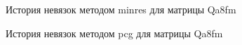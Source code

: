 \begin{figure}[H]
    \renewcommand{\figurename}{Рисунок}
    \caption{История невязок методом minres для матрицы Qa8fm}
    \label{fig:image_18}
\end{figure}

\begin{figure}[H]
    \renewcommand{\figurename}{Рисунок}
    \caption{История невязок методом pcg для матрицы Qa8fm}
    \label{fig:image_19}
\end{figure}

